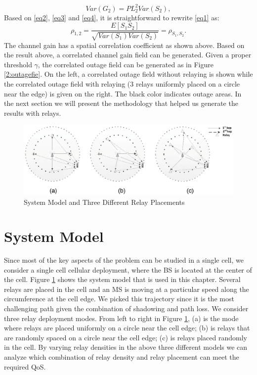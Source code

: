 \begin{equation}
Var(G_{2}) = PL_{2}^{2}Var(S_{2}),
\label{eq4}
\end{equation}
Based on \eqref{eq2}, \eqref{eq3} and \eqref{eq4}, it is straightforward to rewrite \eqref{eq1} as:
\begin{equation}
\rho_{1,2} = \frac{E[S_{1}S_{2}]}{\sqrt{Var(S_{1})Var(S_{2})}} = \rho_{S_{1},S_{2}}.
\end{equation}
The channel gain has a spatial correlation coefficient as shown above. Based on the result above, a correlated channel gain field can be generated. Given a proper threshold $\gamma$, the correlated outage field can be generated as in Figure \ref{2:outagefie}. On the left, a correlated outage field without relaying is shown while the correlated outage field with relaying (3 relays uniformly placed on a circle near the edge) is given on the right. The black color indicates outage areas. In the next section we will present the methodology that helped us generate the results with relays.

\begin{figure}
\centering
\includegraphics[width=14cm]{abc.eps}
\caption{System Model and Three Different Relay Placements}
\label{threemodels}
\end{figure}
\section{System Model}
\label{sec:SystemModel}
Since most of the key aspects of the problem can be studied in a single cell, we consider a single cell cellular deployment, where the BS is located at the center of the cell.  Figure \ref{threemodels} shows the system model that is used in this chapter. Several relays are placed in the cell and an MS is moving at a particular speed along the circumference at the cell edge. We picked this trajectory since it is the most challenging path given the combination of shadowing and path loss. We consider three relay deployment modes. From left to right in Figure \ref{threemodels}, (a) is the mode where relays are placed uniformly on a circle near the cell edge; (b) is relays that are randomly spaced on a circle near the cell edge; (c) is relays placed randomly in the cell. By varying relay densities in the above three different models we can analyze which combination of relay density and relay placement can meet the required QoS.

